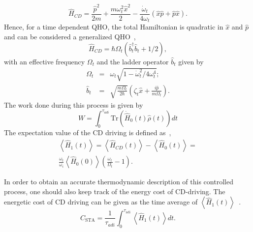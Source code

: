 \documentclass[aps,pra,twocolumn,showpacs,showkeys,groupedaddress,nobalancelastpage,nofootinbib,floatfix,superscriptaddress,longbibliography]{revtex4-2}
\begin{document}
\begin{equation}\label{qho.hcd.sta}
\hat{H}_{CD} = \frac{\hat{p}^2}{2m}+\frac{m\omega_t^2\hat{x}^2}{2} -\frac{\dot{\omega}_t}{4\omega_t} (\hat{x}\hat{p}+\hat{p}\hat{x}).
\end{equation}
Hence, for a time dependent QHO, the total Hamiltonian is quadratic in $\hat{x}$ and $\hat{p}$ and can be considered a generalized QHO~\cite{PhysRevE.96.012133},
\begin{equation}\label{eff.hamiltonian.cd}
\hat{H}_{CD} = \hbar \Omega_t(\hat{b}_t^{\dagger}\hat{b}_t + 1/2),
\end{equation}
with an effective frequency $\Omega_t$ and the ladder operator $\hat{b}_t$ given by
\begin{eqnarray}\label{eff.freq.lad}
  \Omega_t &=& \omega_t\sqrt{1-\dot{\omega}_t^2/4\omega_t^4}; \\
  \hat{b}_t &=& \sqrt{\frac{m\Omega_t}{2\hbar}}(\zeta_t \hat{x} + \frac{i\hat{p}}{m\Omega_t}).
\end{eqnarray}
The work done during this process is given by
\begin{equation}\label{work.adi}
W = \int_{0}^{\tau_{adi}}\text{Tr}(\dot{\hat{H}}_0(t) \hat{\rho}(t)) dt
\end{equation}
The expectation value of the CD driving is defined as~\cite{PhysRevE.98.032121},
\begin{multline}\label{exp.val.cd}
\left\langle \hat{H}_1(t) \right\rangle = \left\langle \hat{H}_{CD}(t) \right\rangle - \left\langle \hat{H}_0(t) \right\rangle=
\\ \frac{\omega_t}{\omega_i} \left\langle \hat{H}_0(0) \right\rangle \left(\frac{\omega_t}{\Omega_t}-1\right). 
\end{multline}

In order to obtain an accurate thermodynamic description of this controlled process, one should also keep track of the energy cost of CD-driving. The energetic cost of CD driving can be given as the time average of $\left\langle \hat{H}_1(t) \right\rangle$~\cite{PhysRevE.98.032121}.
\begin{equation}\label{sta.cost}
C_{\text{STA}} = \frac{1}{\tau_{adi}}\int_{0}^{\tau_{\text{adi}}} \left\langle \hat{H}_1(t) \right\rangle dt.
\end{equation}
\end{document}
